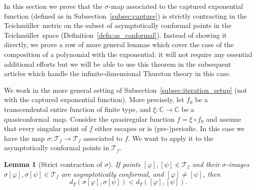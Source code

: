 \documentclass[10pt,reqno,a4paper]{amsart}
\numberwithin{figure}{section}
\numberwithin{equation}{section}
\newtheorem{lmm}[thm]{Lemma}
\newcommand{\tei}{Teichm\"uller}
\newcommand{\qc}{quasiconformal}
\begin{document}
In this section we prove that the $\sigma$-map associated to the captured exponential function (defined as in Subsection~\ref{subsec:capture}) is strictly contracting in the \tei\ metric on the subset of asymptotically conformal points in the \tei\ space (Definition~\ref{defn:as_conformal}). Instead of showing it directly, we prove a row of more general lemmas which cover the case of the composition of a polynomial with the exponential: it will not require any essential additional efforts but we will be able to use this theorem in the subsequent articles which handle the infinite-dimensional Thurston theory in this case.

We work in the more general setting of Subsection~\ref{subsec:iteration_setup} (not with the captured exponential function). More precisely, let $f_0$ be a transcendental entire function of finite type, and $\xi:\mathbb{C}\to\mathbb{C}$ be a \qc\ map. Consider the quasiregular function $f=\xi\circ f_0$ and assume that every singular point of $f$ either escapes or is (pre-)periodic. In this case we have the map $\sigma:\mathcal{T}_{f}\to\mathcal{T}_{f}$ associated to $f$. We want to apply it to the asymptotically conformal points in $\mathcal{T}_f$.

\begin{lmm}[Strict contraction of $\sigma$]
	\label{lmm:strict_contraction}
	If points $[\varphi],[\psi]\in\mathcal{T}_{f}$ and their $\sigma$-images $\sigma[\varphi],\sigma[\psi]\in\mathcal{T}_{f}$ are asymptotically conformal, and $[\varphi]\neq[\psi]$, then
	$$d_T(\sigma[\varphi],\sigma[\psi])<d_T([\varphi],[\psi]).$$
\end{lmm}
\end{document}
